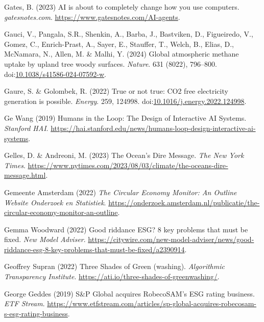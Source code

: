 \documentclass[
  letterpaper,
  DIV=11,
  numbers=noendperiod]{scrartcl}
\newlength{\cslhangindent}
\newenvironment{CSLReferences}[2] %
 {\begin{list}{}{%
  \setlength{\itemindent}{0pt}
  \setlength{\leftmargin}{0pt}
  \setlength{\parsep}{0pt}
  \ifodd #1
   \setlength{\leftmargin}{\cslhangindent}
   \setlength{\itemindent}{-1\cslhangindent}
  \fi
  \setlength{\itemsep}{#2\baselineskip}}}
 {\end{list}}
\begin{document}
\begin{CSLReferences}{0}{1}
Gates, B. (2023) {AI} is about to completely change how you use
computers. \emph{gatesnotes.com}.
\url{https://www.gatesnotes.com/AI-agents}.

Gauci, V., Pangala, S.R., Shenkin, A., Barba, J., Bastviken, D.,
Figueiredo, V., Gomez, C., Enrich-Prast, A., Sayer, E., Stauffer, T.,
Welch, B., Elias, D., McNamara, N., Allen, M. \& Malhi, Y. (2024) Global
atmospheric methane uptake by upland tree woody surfaces. \emph{Nature}.
631 (8022), 796--800.
doi:\href{https://doi.org/10.1038/s41586-024-07592-w}{10.1038/s41586-024-07592-w}.

Gaure, S. \& Golombek, R. (2022) True or not true: {CO2} free
electricity generation is possible. \emph{Energy}. 259, 124998.
doi:\href{https://doi.org/10.1016/j.energy.2022.124998}{10.1016/j.energy.2022.124998}.

Ge Wang (2019) Humans in the {Loop}: {The Design} of {Interactive AI
Systems}. \emph{Stanford HAI}.
\url{https://hai.stanford.edu/news/humans-loop-design-interactive-ai-systems}.

Gelles, D. \& Andreoni, M. (2023) The {Ocean}'s {Dire Message}.
\emph{The New York Times}.
\url{https://www.nytimes.com/2023/08/03/climate/the-oceans-dire-message.html}.

Gemeente Amsterdam (2022) \emph{{The Circular Economy Monitor: An
Outline {\textbar} Website Onderzoek en Statistiek}}.
\url{https://onderzoek.amsterdam.nl/publicatie/the-circular-economy-monitor-an-outline}.

Gemma Woodward (2022) Good riddance {ESG}? 8 key problems that must be
fixed. \emph{New Model Adviser}.
\url{https://citywire.com/new-model-adviser/news/good-riddance-esg-8-key-problems-that-must-be-fixed/a2390914}.

Geoffrey Supran (2022) Three {Shades} of {Green} (washing).
\emph{Algorithmic Transparency Institute}.
\url{https://ati.io/three-shades-of-greenwashing/}.

George Geddes (2019) S\&{P Global} acquires {RobecoSAM}'s {ESG} rating
business. \emph{ETF Stream}.
\url{https://www.etfstream.com/articles/sp-global-acquires-robecosam-s-esg-rating-business}.


\end{CSLReferences}
\end{document}
